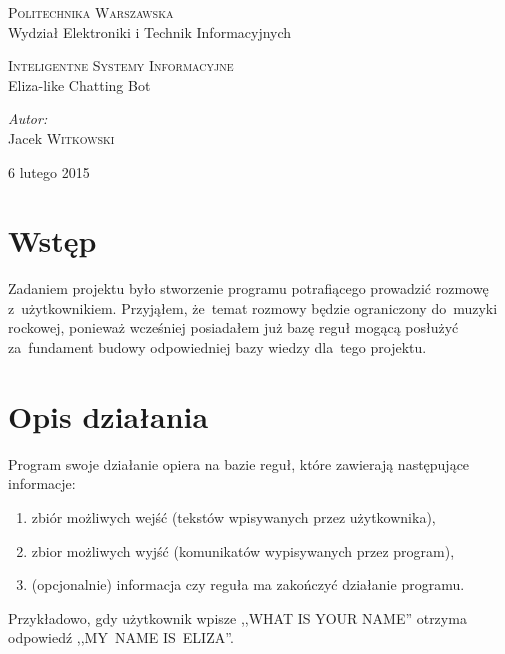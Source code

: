 \documentclass[11pt,a4paper]{article}
\begin{document}
\begin{titlepage}
  \begin{center}

    \textsc{\Large Politechnika Warszawska}\\[0.1cm]
    \small Wydział Elektroniki i Technik Informacyjnych
    \vfill

    \textsc{\small Inteligentne Systemy Informacyjne}\\[0.1cm]
    \Huge Eliza-like Chatting Bot\\[1.5cm]

    \vfill

    \begin{minipage}{0.4\textwidth}
      \begin{flushleft} \large
        \emph{Autor:}\\[0.1cm]
        Jacek \textsc{Witkowski}\\
      \end{flushleft}
    \end{minipage}

    \vfill
    {\large 6 lutego 2015}

  \end{center}
\end{titlepage}
\section{Wstęp}
Zadaniem projektu było stworzenie programu potrafiącego prowadzić rozmowę
z~użytkownikiem. Przyjąłem, że~temat rozmowy będzie ograniczony do~muzyki
rockowej, ponieważ wcześniej posiadałem już bazę reguł mogącą posłużyć
za~fundament budowy odpowiedniej bazy wiedzy dla~tego projektu.

\section{Opis działania}
Program swoje działanie opiera na bazie reguł, które zawierają następujące
informacje:
\begin{enumerate}
  \item zbiór możliwych wejść (tekstów wpisywanych przez użytkownika),
  \item zbior możliwych wyjść (komunikatów wypisywanych przez program),
  \item (opcjonalnie) informacja czy reguła ma zakończyć działanie programu.
\end{enumerate}

Przykładowo, gdy użytkownik wpisze ,,WHAT IS YOUR NAME'' otrzyma odpowiedź
,,MY~NAME IS~ELIZA''.
\end{document}
